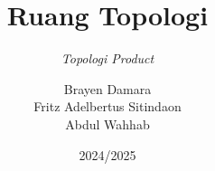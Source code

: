 \documentclass{beamer}
\title{Ruang Topologi}
\subtitle{\textit{Topologi Product}}
\date[]{2024/2025}
\author[Brayen, Fritz, Wahab]{Brayen Damara\\Fritz Adelbertus Sitindaon\\Abdul Wahhab}
\begin{document}
\begin{frame}
\titlepage
\end{frame}





\end{document}
